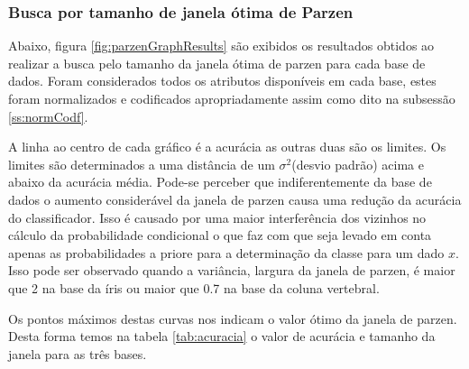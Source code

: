 \documentclass[ 
	article,			%
	11pt,				%
	oneside,			%
	a4paper,			%
	english,			%
	brazil,				%
	]{abntex2}
\begin{document}
\subsubsection{Busca por tamanho de janela ótima de Parzen}
\label{sss:OptSizWindSearc}

Abaixo, figura \ref{fig:parzenGraphResults} são exibidos os resultados obtidos
ao realizar a busca pelo tamanho da janela ótima de parzen para cada base de dados.
Foram considerados todos os atributos disponíveis em cada base, estes
foram normalizados e codificados apropriadamente assim como dito na
subsessão \ref{ss:normCodf}.


A linha ao centro de cada gráfico é a acurácia as outras duas são os limites.
Os limites são determinados a uma distância de um $\sigma^2$(desvio padrão)
acima e abaixo da acurácia média. Pode-se perceber que indiferentemente da base
de dados o aumento considerável da janela de parzen causa uma redução da
acurácia do classificador. Isso é causado por uma maior interferência dos vizinhos no
cálculo da probabilidade condicional o que faz com que seja levado em conta
apenas as probabilidades a priore para a determinação da classe para um dado
$x$. Isso pode ser observado quando a variância, largura da janela de parzen, é
maior que 2 na base da íris ou maior que 0.7 na base da coluna vertebral.

Os pontos máximos destas curvas nos indicam o valor ótimo da janela de parzen.
Desta forma temos na tabela \ref{tab:acuracia} o valor de acurácia e tamanho da
janela para as três bases.
\end{document}
